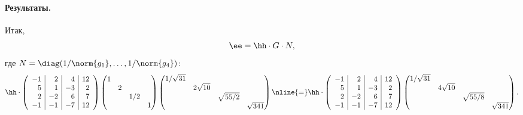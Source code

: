 \begin{solution}
	\paragraph{Результаты.}
	Итак,
	\[
		\ee = \hh \cdot G \cdot N,
	\]
	где $N = \diag(1/\norm{g_1}, \dots, 1/\norm{g_4})$:
	\begin{multline*}
		\hh \cdot
		\left( 
			\begin{array}{r|r|r|r}
				-1 &  2 &  4 & 12 \\
				 5 &  1 & -3 &  2 \\
				 2 & -2 &  6 &  7 \\
				-1 & -1 & -7 & 12
			\end{array}
		\right)
		\begin{pmatrix}
			1 \\
			& 2 \\
			&& 1/2 \\
			&&& 1
		\end{pmatrix}
		\begin{pmatrix}
			1/\sqrt{31} \\
			& 2\sqrt{10} \\
			&& \sqrt{55/2} \\
			&&& \sqrt{341}
		\end{pmatrix}
		\nline{=}
		\hh \cdot
		\left( 
			\begin{array}{r|r|r|r}
				-1 &  2 &  4 & 12 \\
				 5 &  1 & -3 &  2 \\
				 2 & -2 &  6 &  7 \\
				-1 & -1 & -7 & 12
			\end{array}
		\right)
		\begin{pmatrix}
			1/\sqrt{31} \\
			& 4\sqrt{10} \\
			&& \sqrt{55/8} \\
			&&& \sqrt{341}
		\end{pmatrix}
		.
	\end{multline*}
\end{solution}
